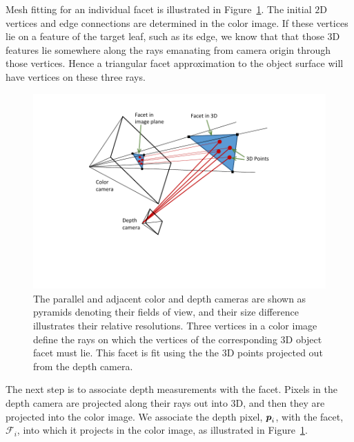 Mesh fitting for an individual facet is illustrated in Figure~\ref{fig:facet}.  The initial $2$D vertices and edge connections are determined in the color image.  If these vertices lie on a feature of the target leaf, such as its edge, we know that that those $3$D features lie somewhere along the rays emanating from camera origin through those vertices.  Hence a triangular facet approximation to the object surface will have vertices on these three rays.  

\begin{figure}
\begin{center}
   \includegraphics[trim=80 70 70 20,clip,width=0.95\linewidth]{Figures/pointFittingConcept}
\end{center}
   \caption{The parallel and adjacent color and depth cameras are shown as pyramids denoting their fields of view, and their size difference illustrates their relative resolutions.  Three vertices in a color image define the rays on which the vertices of the corresponding $3$D object facet must lie.  This facet is fit using the the $3$D points projected out from the depth camera.}
\label{fig:facet}
\end{figure}

The next step is to associate depth measurements with the facet.  Pixels in the depth camera are projected along their rays out into $3$D, and then they are projected into the color image.  We associate the depth pixel, $\boldsymbol{p}_i$, with the facet, $\mathcal{F}_i$, into which it projects in the color image, as illustrated in Figure~\ref{fig:facet}. 


